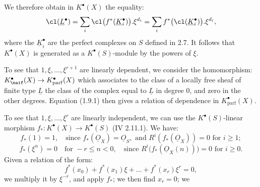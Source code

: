 We therefore obtain in $K^{\bullet}(X)$ the equality:
\[
  \cl(\underline{L}^{\bullet})
  =\sum_i\cl\bigl(f^*(\underline{K}_i^{\bullet})\bigr).\xi^{d_i}
  =\sum_i f^*\bigl(\cl(\underline{K}_i^{\bullet})\bigr).\xi^{d_i},
\]
where the $\underline{K}_i^{\bullet}$ are the perfect complexes on $S$ defined in 2.7. It follows that $K^{\bullet}(X)$ is generated as a $K^{\bullet}(S)$-module by the powers of $\xi$.

To see that $1,\xi,\ldots,\xi^{r+1}$ are linearly dependent, we consider the homomorphism: $K^{\bullet}_{\naif}(X)\to K^{\bullet}_{\mathrm{parf}}(X)$ which associates to the class of a locally free sheaf of finite type $\underline{L}$ the class of the complex equal to $\underline{L}$ in degree $0$, and zero in the other degrees. Equation (1.9.1) then gives a relation of dependence in $K^{\bullet}_{\mathrm{parf}}(X)$.

To see that $1,\xi,\ldots,\xi^r$ are linearly independent, we can use the $K^{\bullet}(S)$-linear morphism $f_*:K^{\bullet}(X)\to K^{\bullet}(S)$ (IV 2.11.1). We have:
\[
  f_*(1)=1,
  \quad\text{since } f_*(\underline{O}_X)=\underline{O}_S,\text{ and }R^i(f_*(\underline{O}_X))=0\text{ for }i\geq1;
\]
\[
  f_*(\xi^n)=0\quad\text{for }-r\leq n<0,
  \quad\text{since }R^i\bigl(f_*(\underline{O}_X(n))\bigr)=0\text{ for }i\geq0.
\]
Given a relation of the form:
\[
  f^*(x_0)+f^*(x_1)\xi+\ldots+f^*(x_r)\xi^r=0,
\]
we multiply it by $\xi^{-r}$, and apply $f_*$; we then find $x_r=0$; we
